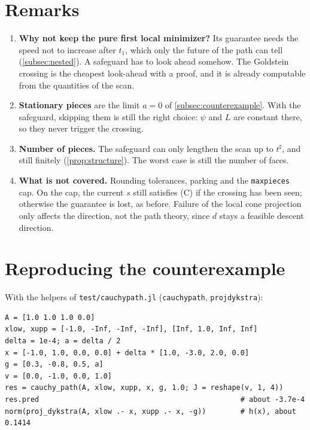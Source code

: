 \documentclass[11pt,a4paper]{article}
\numberwithin{equation}{section}
\theoremstyle{plain}
\theoremstyle{definition}
\theoremstyle{remark}
\newcommand{\codeus}{\textunderscore\allowbreak}
\newcommand{\code}[1]{{\let\_\codeus\texttt{#1}}}
\begin{document}
\section{Remarks}\label{sec:remarks}

\begin{enumerate}[1.]
\item \textbf{Why not keep the pure first local minimizer?} Its guarantee needs the speed not to
  increase after $t_1$, which only the future of the path can tell
  (\cref{subsec:nested}). A safeguard has to look ahead somehow. The Goldstein crossing is the
  cheapest look-ahead with a proof, and it is already computable from the quantities of the
  scan.
\item \textbf{Stationary pieces} are the limit $a=0$ of \cref{subsec:counterexample}. With the
  safeguard, skipping them is still the right choice: $\psi$ and $L$ are constant there, so
  they never trigger the crossing.
\item \textbf{Number of pieces.} The safeguard can only lengthen the scan up to $t^\sharp$, and
  still finitely (\cref{prop:structure}). The worst case is still the number of faces.
\item \textbf{What is not covered.} Rounding tolerances, parking and the \code{maxpieces} cap.
  On the cap, the current $s$ still satisfies (C) if the crossing has been seen; otherwise the
  guarantee is lost, as before. Failure of the local cone projection only affects the
  direction, not the path theory, since $d$ stays a feasible descent direction.
\end{enumerate}

\appendix
\section{Reproducing the counterexample}

With the helpers of \code{test/cauchy\_path.jl} (\code{cauchy\_path}, \code{proj\_dykstra}):

\begin{lstlisting}
A = [1.0 1.0 1.0 0.0]
xlow, xupp = [-1.0, -Inf, -Inf, -Inf], [Inf, 1.0, Inf, Inf]
delta = 1e-4; a = delta / 2
x = [-1.0, 1.0, 0.0, 0.0] + delta * [1.0, -3.0, 2.0, 0.0]
g = [0.3, -0.8, 0.5, a]
v = [0.0, -1.0, 0.0, 1.0]
res = cauchy_path(A, xlow, xupp, x, g, 1.0; J = reshape(v, 1, 4))
res.pred                                               # about -3.7e-4
norm(proj_dykstra(A, xlow .- x, xupp .- x, -g))        # h(x), about 0.1414
\end{lstlisting}
\end{document}
